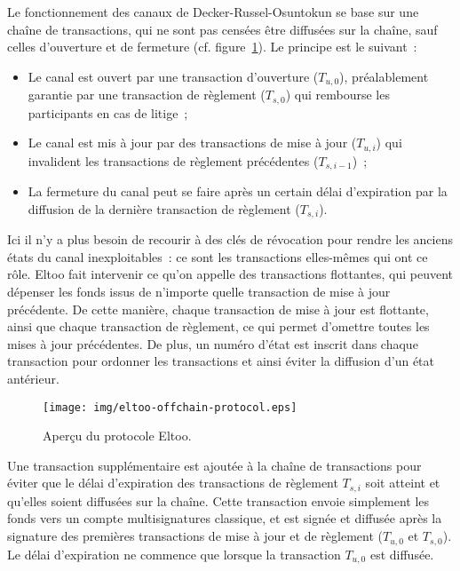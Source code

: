 Le fonctionnement des canaux de Decker-Russel-Osuntokun se base sur une chaîne de transactions, qui ne sont pas censées être diffusées sur la chaîne, sauf celles d'ouverture et de fermeture (cf. figure~\ref{fig:eltoo}). Le principe est le suivant~:

\begin{itemize}
\item Le canal est ouvert par une transaction d'ouverture ($T_{u,0}$), préalablement garantie par une transaction de règlement ($T_{s,0}$) qui rembourse les participants en cas de litige~;
\item Le canal est mis à jour par des transactions de mise à jour ($T_{u,i}$) qui invalident les transactions de règlement précédentes ($T_{s,i-1}$)~;
\item La fermeture du canal peut se faire après un certain délai d'expiration par la diffusion de la dernière transaction de règlement ($T_{s,i}$).
\end{itemize}

Ici il n'y a plus besoin de recourir à des clés de révocation pour rendre les anciens états du canal inexploitables~: ce sont les transactions elles-mêmes qui ont ce rôle. Eltoo fait intervenir ce qu'on appelle des transactions flottantes, qui peuvent dépenser les fonds issus de n'importe quelle transaction de mise à jour précédente. De cette manière, chaque transaction de mise à jour est flottante, ainsi que chaque transaction de règlement, ce qui permet d'omettre toutes les mises à jour précédentes. De plus, un numéro d'état est inscrit dans chaque transaction pour ordonner les transactions et ainsi éviter la diffusion d'un état antérieur. %

\begin{figure}[h]
  \centering
  \texttt{[image: img/eltoo-offchain-protocol.eps]}
  \caption{Aperçu du protocole Eltoo.}
  \label{fig:eltoo}
\end{figure}

Une transaction supplémentaire est ajoutée à la chaîne de transactions pour éviter que le délai d'expiration des transactions de règlement $T_{s,i}$ soit atteint et qu'elles soient diffusées sur la chaîne. Cette transaction envoie simplement les fonds vers un compte multisignatures classique, et est signée et diffusée après la signature des premières transactions de mise à jour et de règlement ($T_{u,0}$ et $T_{s,0}$). Le délai d'expiration ne commence que lorsque la transaction $T_{u,0}$ est diffusée.

